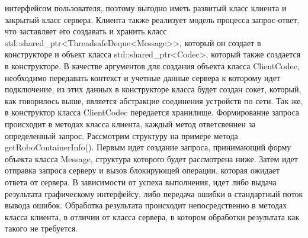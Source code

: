 \documentclass[a4paper, 14pt]{extreport}
\begin{document}
интерфейсом пользователя, поэтому выгодно иметь развитый класс клиента и закрытый класс сервера. Клиента также реализует модель 
процесса запрос-ответ, что заставляет его создавать и хранить класс std::shared\_ptr<ThreadsafeDeque<Message>>, который он создает в 
конструкторе и объект класса std::shared\_ptr<Codec>, который также создается в конструкторе. В качестве аргументов для создания 
объекта класса ClientCodec, необходимо передавать контекст и учетные данные сервера к которому идет подключение, из этих данных в 
конструкторе класса будет создан сокет, который, как говорилось выше, является абстракцие соединения устройств по сети. Так же, в 
конструктор класса ClientCodec передается хранилище. Формирование запроса происходит в методах класса клиента, каждый метод ответсвеннен
за определенный запрос. Рассмотрим структуру на примере метода getRoboContainerInfo(). Первым идет создание запроса, принимающий форму 
объекта класса Message, структура которого будет рассмотрена ниже. Затем идет отправка запроса серверу и вызов блокирующей операции,
которая ожидает ответа от сервера. В зависимости от успеха выполнения, идет либо выдача результата графическому интерфейсу, либо 
передача ошибки в стандартный поток вывода ошибок. Обработка результата происходит непосредственно в методах класса клиента, в отличии 
от класса сервера, в котором обработки результата как такого не требуется.
\end{document}
